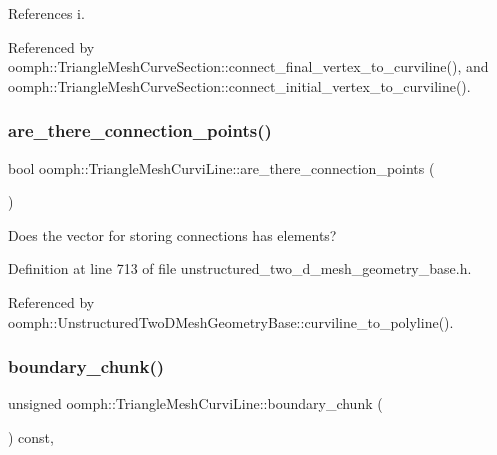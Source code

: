 References i.



Referenced by oomph\+::\+Triangle\+Mesh\+Curve\+Section\+::connect\+\_\+final\+\_\+vertex\+\_\+to\+\_\+curviline(), and oomph\+::\+Triangle\+Mesh\+Curve\+Section\+::connect\+\_\+initial\+\_\+vertex\+\_\+to\+\_\+curviline().

\mbox{\label{classoomph_1_1TriangleMeshCurviLine_a040f5978d5efa810b0b96fd17b9c0108}} 
\subsubsection{\texorpdfstring{are\+\_\+there\+\_\+connection\+\_\+points()}{are\_there\_connection\_points()}}
{\footnotesize\ttfamily bool oomph\+::\+Triangle\+Mesh\+Curvi\+Line\+::are\+\_\+there\+\_\+connection\+\_\+points (\begin{DoxyParamCaption}{ }\end{DoxyParamCaption})\hspace{0.3cm}{\ttfamily [inline]}}



Does the vector for storing connections has elements? 



Definition at line 713 of file unstructured\+\_\+two\+\_\+d\+\_\+mesh\+\_\+geometry\+\_\+base.\+h.



Referenced by oomph\+::\+Unstructured\+Two\+D\+Mesh\+Geometry\+Base\+::curviline\+\_\+to\+\_\+polyline().

\mbox{\label{classoomph_1_1TriangleMeshCurviLine_a42b8ef1fb0ad0078413d0fedc87af679}} 
\subsubsection{\texorpdfstring{boundary\+\_\+chunk()}{boundary\_chunk()}}
{\footnotesize\ttfamily unsigned oomph\+::\+Triangle\+Mesh\+Curvi\+Line\+::boundary\+\_\+chunk (\begin{DoxyParamCaption}{ }\end{DoxyParamCaption}) const\hspace{0.3cm}{\ttfamily [inline]}, {\ttfamily [virtual]}}

